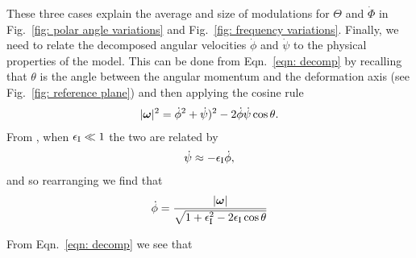 \documentclass[../full_thesis/full_thesis.tex]{subfiles}
\begin{document}
These three cases explain the average and size of modulations for $\Theta$ and
$\dot{\Phi}$ in Fig.~\ref{fig: polar angle variations} and Fig.~\ref{fig:
frequency variations}. Finally, we need to relate the decomposed angular
velocities $\dot{\phi}$ and $\dot{\psi}$ to the physical properties of the
model.  This can be done from Eqn.~\eqref{eqn: decomp} by recalling that
$\theta$ is the angle between the angular momentum and the deformation axis
(see Fig.~\ref{fig: reference plane}) and then applying the cosine rule
\begin{align}
|\boldsymbol{\omega}|^{2} = \dot{\phi}^{2}+\dot{\psi})^{2} - 2\dot{\phi}\dot{\psi}\cos\theta.
\end{align}
From \citet{Jones2001}, when $\epsilon_{\mathrm{I}} \ll 1$ the two are related by
\begin{align}
\dot{\psi} \approx - \epsilon_{\mathrm{I}} \dot{\phi},
\end{align}
and so rearranging we find that
\begin{align}
\dot{\phi} = \frac{|\boldsymbol{\omega}|}{\sqrt{1+\epsilon_{\mathrm{I}}^{2} - 2\epsilon_{\mathrm{I}}\cos\theta}}
\end{align}

From Eqn.~\eqref{eqn: decomp} we see that


%
%
%
\end{document}
